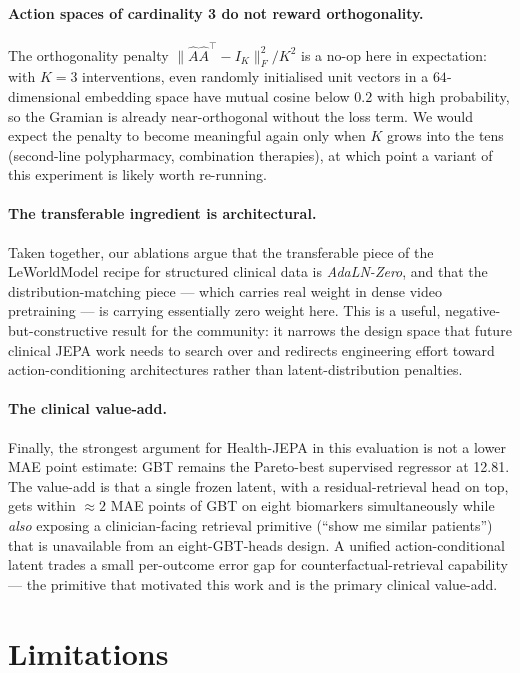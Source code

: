 \paragraph{Action spaces of cardinality 3 do not reward orthogonality.}
The orthogonality penalty
$\lVert \hat A \hat A^\top - I_K \rVert_F^2 / K^2$ is a no-op here in
expectation: with $K=3$ interventions, even randomly initialised unit
vectors in a $64$-dimensional embedding space have mutual cosine below
$0.2$ with high probability, so the Gramian is already near-orthogonal
without the loss term. We would expect the penalty to become meaningful
again only when $K$ grows into the tens (second-line polypharmacy,
combination therapies), at which point a variant of this experiment is
likely worth re-running.

\paragraph{The transferable ingredient is architectural.} Taken
together, our ablations argue that the transferable piece of the
LeWorldModel recipe for structured clinical data is \emph{AdaLN-Zero},
and that the distribution-matching piece --- which carries real weight
in dense video pretraining --- is carrying essentially zero weight here.
This is a useful, negative-but-constructive result for the community:
it narrows the design space that future clinical JEPA work needs to
search over and redirects engineering effort toward action-conditioning
architectures rather than latent-distribution penalties.

\paragraph{The clinical value-add.} Finally, the strongest argument for
Health-JEPA in this evaluation is not a lower MAE point estimate: GBT
remains the Pareto-best supervised regressor at 12.81. The value-add is
that a single frozen latent, with a residual-retrieval head on top, gets
within $\approx 2$ MAE points of GBT on eight biomarkers simultaneously
while \emph{also} exposing a clinician-facing retrieval primitive
(``show me similar patients'') that is unavailable from an
eight-GBT-heads design. A unified action-conditional latent trades a
small per-outcome error gap for counterfactual-retrieval capability ---
the primitive that motivated this work and is the primary clinical
value-add.

\section{Limitations}
\label{sec:limitations}

